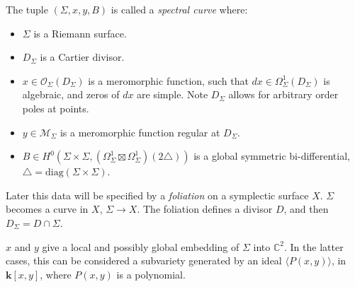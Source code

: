     
    \begin{defn}
    \label{defn:spectral_curve} 
    The tuple \( ( \Sigma, x,y,B)\) is called a \emph{spectral curve} where:
    
    
    \begin{itemize} 
    \item \( \Sigma \) is a Riemann surface.

    \item \(D_\Sigma \) is a Cartier divisor.
    
    \item \(x \in  \mathcal{O}_\Sigma(D_\Sigma)\) is a meromorphic function, such that \(dx \in  \Omega_{\Sigma}^1 (D_\Sigma)\) is algebraic, and zeros of \(dx\) are simple. Note \(D_\Sigma\) allows for arbitrary order poles at points.
    
    \item  \(y \in  \mathcal{M}_\Sigma\) is a meromorphic function regular at \(D_\Sigma \).

    \item  \( B \in H^0( \Sigma \times \Sigma, (\Omega_\Sigma^1 \boxtimes \Omega_\Sigma^1)(2 \triangle)) \) is a global symmetric bi-differential, \( \triangle = \mathrm{diag}(\Sigma \times \Sigma) \).
    \end{itemize}
    
    
    \end{defn}
    Later this data will be specified by a  \emph{foliation} on a symplectic surface \(X\). \( \Sigma\) becomes a curve in \(X\), \( \Sigma \rightarrow X\). The foliation defines a divisor \(D\), and then \(D_\Sigma = D \cap \Sigma\). 
    
    \begin{rem}
    \(x\) and \(y\) give a local and possibly global embedding of \(\Sigma \) into \( \mathbb{C}^2\).
    In the latter cases, this can be considered a subvariety generated by an ideal \( \langle P(x,y)\rangle\), in \( \mathbf{k}[x,y]\), where \(P(x,y)\) is a polynomial.
    \end{rem}
    
    
    
    
    
    
